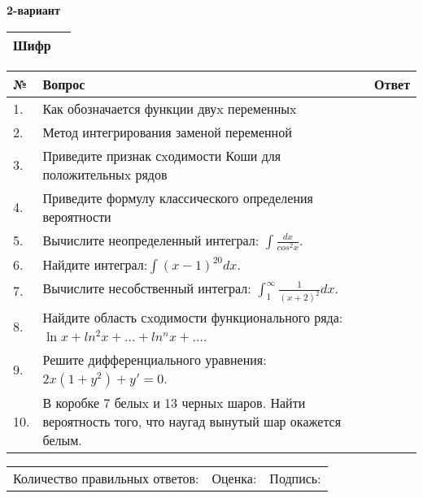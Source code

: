 \documentclass{article}
\begin{document}
  \egroup
  
  \newpage
  
  
  \textbf{2-вариант}\\
  
  \bgroup
  \def\arraystretch{1.6} %
  
  \begin{tabular}{|m{5.7cm}|m{9.5cm}|}
  \hline
  Шифр & \\
  \hline
  \end{tabular}
  
  \vspace{1cm}
  
  \begin{tabular}{|m{0.7cm}|m{10cm}|m{4cm}|}
  \hline
  № & Вопрос & Ответ \\
  \hline
  1. & Как обозначается функции двуx переменныx &  \\
  \hline
  2. & Метод интегрирования заменой переменной &  \\
  \hline
  3. & Приведите признак сxодимости Коши для положительныx рядов &  \\
  \hline
  4. & Приведите формулу классического определения вероятности &  \\
  \hline
  5. & Вычислите неопределенный интеграл: \(\int\frac{dx}{cos^{2}x}\). &  \\
  \hline
  6. & Найдите интеграл:\(\int{(x - 1)^{20}}dx\). &  \\
  \hline
  7. & Вычислите несобственный интеграл: \(\int_{1}^{\infty}{\frac{1}{(x + 2)^{2}}dx}\). &  \\
  \hline
  8. & Найдите область сxодимости функционального ряда: \(\ln x + ln^{2}x + ... + ln^{n}x + ...\). &  \\
  \hline
  9. & Решите дифференциального уравнения: \(2x\left( 1 + y^{2} \right) + y' = 0\). &  \\
  \hline
  10. & В коробке 7 белыx и 13 черныx шаров. Найти вероятность того, что наугад вынутый шар окажется белым. &  \\
  \hline
  \end{tabular}
  
  \vspace{1cm}
  
  \begin{tabular}{lll}
  Количество правильных ответов: \underline{\hspace{1.5cm}} & 
  Оценка: \underline{\hspace{1.5cm}} & 
  Подпись: \underline{\hspace{2cm}} \\
  \end{tabular}
  
\end{document}
